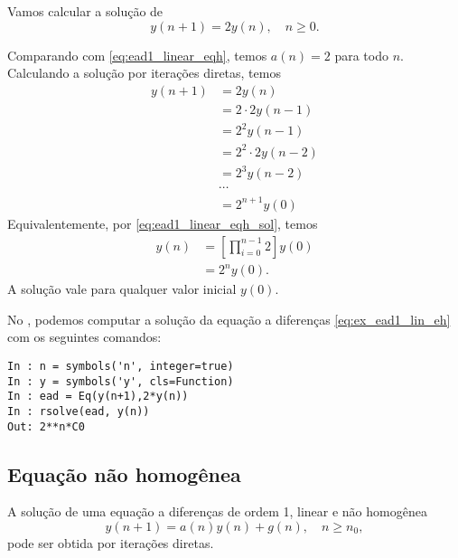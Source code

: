 \begin{ex}
  Vamos calcular a solução de
  \begin{equation}\label{eq:ex_ead1_lin_eh}
    y(n+1) = 2y(n),\quad n\geq 0.
  \end{equation}

  Comparando com \eqref{eq:ead1_linear_eqh}, temos $a(n) = 2$ para todo $n$. Calculando a solução por iterações diretas, temos
  \begin{align}
    y(n+1) &= 2y(n) \\
            &= 2\cdot 2y(n-1) \\
            &= 2^2y(n-1) \\
            &= 2^2\cdot 2y(n-2) \\
            &= 2^3y(n-2) \\
            &\cdots \\
            &= 2^{n+1}y(0)
  \end{align}
  Equivalentemente, por \eqref{eq:ead1_linear_eqh_sol}, temos
  \begin{align}
    y(n) &= \left[\prod_{i=0}^{n-1}2\right]y(0) \\
         &= 2^{n}y(0).
  \end{align}
  A solução vale para qualquer valor inicial $y(0)$.

  \ifispython
  No \python, podemos computar a solução da equação a diferenças \eqref{eq:ex_ead1_lin_eh} com os seguintes comandos:
\begin{verbatim}
In : n = symbols('n', integer=true)
In : y = symbols('y', cls=Function)
In : ead = Eq(y(n+1),2*y(n))
In : rsolve(ead, y(n))
Out: 2**n*C0
\end{verbatim}
  \fi
\end{ex}

\subsection{Equação não homogênea}

A solução de uma equação a diferenças de ordem 1, linear e não homogênea
\begin{equation}\label{eq:ead1_linear_eqnh}
  y(n+1) = a(n)y(n) + g(n),\quad n\geq n_0,
\end{equation}
pode ser obtida por iterações diretas.

